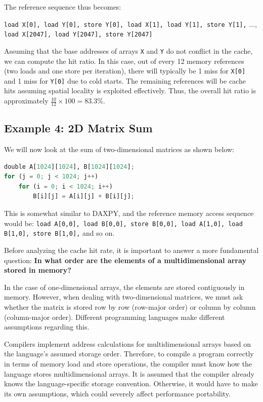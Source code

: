\documentclass[12pt]{book}
\begin{document}
The reference sequence thus becomes: 
\begin{center}
\texttt{load X[0], load Y[0], store Y[0], load X[1], load Y[1], store Y[1],} $\dots$, \texttt{load X[2047], load Y[2047], store Y[2047]}
\end{center}

Assuming that the base addresses of arrays \texttt{X} and \texttt{Y} do not conflict in the cache, we can compute the hit ratio. In this case, out of every 12 memory references (two loads and one store per iteration), there will typically be 1 miss for \texttt{X[0]} and 1 miss for \texttt{Y[0]} due to cold starts. The remaining references will be cache hits assuming spatial locality is exploited effectively. Thus, the overall hit ratio is approximately $\frac{10}{12}\times 100 =  83.3\%$.

\subsection{Example 4: 2D Matrix Sum}
We will now look at the sum of two-dimensional matrices as shown below:

\begin{lstlisting}[language=Python]
double A[1024][1024], B[1024][1024];
for (j = 0; j < 1024; j++)
    for (i = 0; i < 1024; i++)
        B[i][j] = A[i][j] + B[i][j];
\end{lstlisting}

This is somewhat similar to DAXPY, and the reference memory access sequence would be:  
\texttt{load A[0,0], load B[0,0], store B[0,0], load A[1,0], load B[1,0], store B[1,0],} and so on.

Before analyzing the cache hit rate, it is important to answer a more fundamental question:  
\textbf{In what order are the elements of a multidimensional array stored in memory?}

In the case of one-dimensional arrays, the elements are stored contiguously in memory. However, when dealing with two-dimensional matrices, we must ask whether the matrix is stored row by row (row-major order) or column by column (column-major order). Different programming languages make different assumptions regarding this.

Compilers implement address calculations for multidimensional arrays based on the language's assumed storage order. Therefore, to compile a program correctly in terms of memory load and store operations, the compiler must know how the language stores multidimensional arrays. It is assumed that the compiler already knows the language-specific storage convention. Otherwise, it would have to make its own assumptions, which could severely affect performance portability.
\end{document}
